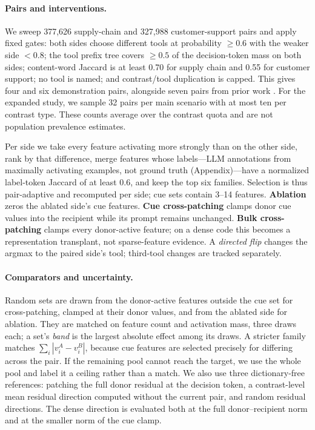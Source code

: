 \documentclass{article}
\begin{document}
\paragraph{Pairs and interventions.}
We sweep 377,626 supply-chain and 327,988 customer-support pairs and apply
fixed gates: both sides choose different tools at probability $\geq0.6$ with
the weaker side $<0.8$; the tool prefix tree covers $\geq0.5$ of the
decision-token mass on both sides; content-word Jaccard is at least 0.70 for
supply chain and 0.55 for customer support; no tool is named; and contrast/tool
duplication is capped. This gives four and six demonstration
pairs, alongside seven pairs from prior work \citep{ref_hapke2025}. For the
expanded study, we sample 32 pairs per main scenario with at most ten per
contrast type. These counts average over the contrast quota and are not
population prevalence estimates.

Per side we take every feature activating more strongly than on the other
side, rank by that difference, merge features whose labels---LLM annotations
from maximally activating examples, not ground truth (Appendix)---have
a normalized label-token Jaccard of at least 0.6, and keep the top six families. Selection is thus pair-adaptive and
recomputed per side; cue sets contain 3--14 features.
\textbf{Ablation} zeros the ablated side's cue features.
\textbf{Cue cross-patching} clamps donor cue values into the recipient while
its prompt remains unchanged. \textbf{Bulk cross-patching} clamps every
donor-active feature; on a dense code this becomes a representation transplant,
not sparse-feature evidence. A \emph{directed flip} changes the argmax to the
paired side's tool; third-tool changes are tracked separately.

\paragraph{Comparators and uncertainty.}
Random sets are drawn from the donor-active features outside the cue set for
cross-patching, clamped at their donor values, and from the ablated side for
ablation. They are matched on feature count and activation mass, three draws
each; a set's \emph{band} is the largest absolute effect among its draws. A
stricter family matches
$\sum_i|v_i^A-v_i^B|$, because cue features are selected precisely for
differing across the pair. If the remaining pool cannot reach the target, we
use the whole pool and label it a ceiling rather than a match. We also use
three dictionary-free references: patching the full donor residual at the
decision token, a contrast-level mean residual direction computed without the
current pair, and random residual directions. The dense direction is evaluated
both at the full donor--recipient norm and at the smaller norm of the cue
clamp.
\end{document}
